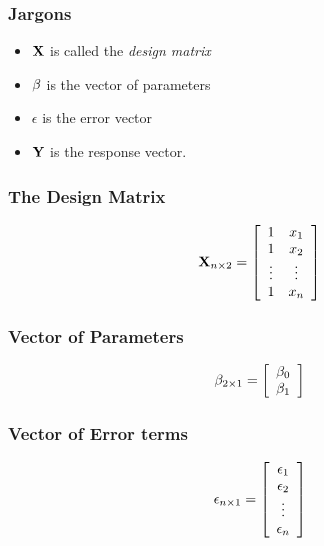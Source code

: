 \subsubsection*{Jargons}
\begin{itemize}
  \item $\mathbf{X}$  is called the {\it design matrix}
  \item $\mathbf{\beta}$ is the vector of parameters
  \item $\epsilon$ is the error vector
  \item $\mathbf{Y}$ is the response vector.
\end{itemize}

\subsubsection*{The Design Matrix}

\begin{equation*}
\mathbf{X}_{n \times 2} = \left[ \begin{array}{cc} 1   &x_1\\ 1 & x_2 \\ \vdots & \vdots \\ 1 & x_n\\ \end{array} \right]
\end{equation*}

\subsubsection*{Vector of Parameters}

\begin{equation*}
\mathbf{\beta}_{2 \times 1} =\left[ \begin{array}{c} \beta_0\\ \beta_1 \\ \end{array} \right] 
\end{equation*}

\subsubsection*{Vector of Error terms}

\begin{equation*}
\mathbf{\epsilon}_{n \times 1} =\left[ \begin{array}{c} \epsilon_1\\ \epsilon_2 \\ \vdots \\ \epsilon_n\\ \end{array} \right]
\end{equation*}

